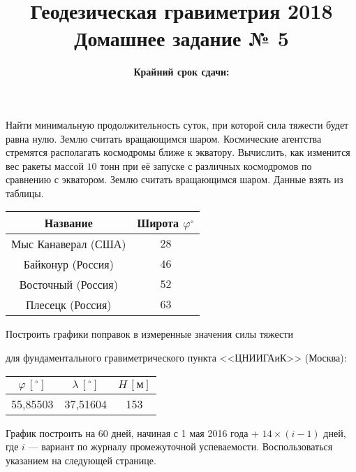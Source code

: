 \documentclass[11pt, a4paper,addpoints]{exam}
\title{{\Large Геодезическая гравиметрия 2018}\\ 
    {\bf\Large Домашнее задание № 5}}
\author{}
\date{\normalsize\bf Крайний срок сдачи: \DTMusedate{deadline}}
\theoremstyle{remark}
\renewcommand{\phi}{\ensuremath{\varphi}}
\begin{document}
\maketitle
\thispagestyle{empty}
\begin{questions}
        \question[1] Найти минимальную продолжительность суток, при которой сила тяжести будет равна
        нулю. Землю считать вращающимся шаром.
        \question[1] Космические агентства стремятся располагать космодромы ближе к экватору.
        Вычислить, как изменится вес ракеты массой $10$ тонн при её запуске с различных космодромов
        по сравнению с экватором. Землю считать вращающимся шаром. Данные взять из таблицы.
        \begin{table}[h]
            \centering
            \begin{tabular}{|c|c|}
                \hline
                Название & Широта $\phi ^\circ$ \\ \hline
                Мыс Канаверал (США) & $28$ \\ \hline
                Байконур (Россия) & $46$ \\ \hline
                Восточный (Россия) & $52$ \\ \hline
                Плесецк (Россия) & $63$ \\\hline
            \end{tabular}
        \end{table}
        \question[3] Построить графики поправок в измеренные значения силы тяжести 
        для фундаментального гравиметрического пункта <<ЦНИИГАиК>> (Москва):
        \begin{table}[h]
            \centering
            \begin{tabular}{|c|c|c|}
                \hline
                 $\phi\, [^\circ]$ & $\lambda\, [^\circ]$ &$H\, [\text{м}]$ \\\hline
                 55,85503 & 37,51604 & 153\\\hline
            \end{tabular}
        \end{table}

        График построить на 60 дней, начиная с 1 мая 2016 года + $14\times (i - 1)$ дней, где $i$ ---
        вариант по журналу промежуточной успеваемости. Воспользоваться указанием на следующей странице.
\end{questions}
\end{document}
